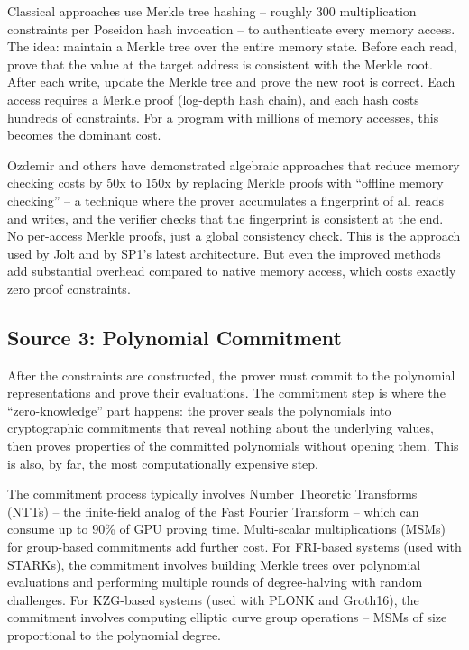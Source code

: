 \documentclass[
  11pt,
  openany]{report}
\begin{document}
Classical approaches use Merkle tree hashing -- roughly 300 multiplication
constraints per Poseidon hash invocation -- to authenticate every memory access.
The idea: maintain a Merkle tree over the entire memory state. Before each read,
prove that the value at the target address is consistent with the Merkle root.
After each write, update the Merkle tree and prove the new root is correct. Each
access requires a Merkle proof (log-depth hash chain), and each hash costs
hundreds of constraints. For a program with millions of memory accesses, this
becomes the dominant cost.

Ozdemir and others have demonstrated algebraic approaches that reduce memory
checking costs by 50x to 150x by replacing Merkle proofs with ``offline memory
checking'' -- a technique where the prover accumulates a fingerprint of all
reads and writes, and the verifier checks that the fingerprint is consistent at
the end. No per-access Merkle proofs, just a global consistency check. This is
the approach used by Jolt and by SP1's latest architecture. But even the
improved methods add substantial overhead compared to native memory access,
which costs exactly zero proof constraints.

\subsection{Source 3: Polynomial
Commitment}\label{source-3-polynomial-commitment}

After the constraints are constructed, the prover must commit to the polynomial
representations and prove their evaluations. The commitment step is where the
``zero-knowledge'' part happens: the prover seals the polynomials into
cryptographic commitments that reveal nothing about the underlying values, then
proves properties of the committed polynomials without opening them. This is
also, by far, the most computationally expensive step.

The commitment process typically involves Number Theoretic Transforms (NTTs) --
the finite-field analog of the Fast Fourier Transform -- which can consume up to
90\% of GPU proving time. Multi-scalar multiplications (MSMs) for group-based
commitments add further cost. For FRI-based systems (used with STARKs), the
commitment involves building Merkle trees over polynomial evaluations and
performing multiple rounds of degree-halving with random challenges. For
KZG-based systems (used with PLONK and Groth16), the commitment involves
computing elliptic curve group operations -- MSMs of size proportional to the
polynomial degree.
\end{document}
